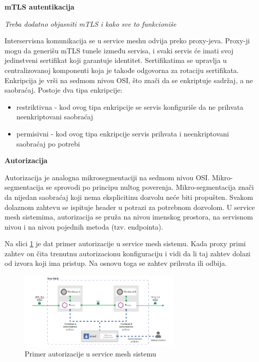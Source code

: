 \documentclass[a4paper,12pt]{report}
\begin{document}
\textbf{mTLS autentikacija}\newline

\textit{Treba dodatno objasniti mTLS i kako sve to funkcioniše}\newline

Interservisna komunikacija se u service meshu odvija preko proxy-jeva. Proxy-ji mogu da generišu mTLS tunele između servisa, i svaki servis će imati svoj jedinstveni sertifikat koji garantuje identitet. Sertifikatima se upravlja u centralizovanoj komponenti koja je takođe odgovorna za rotaciju sertifikata. Enkripcija je vrši na sedmom nivou OSI, što znači da se enkriptuje sadržaj, a ne saobraćaj. 
Postoje dva tipa enkripcije: 

\begin{itemize}
	\item restriktivna - kod ovog tipa enkripcije se servis konfiguriše da ne prihvata neenkriptovani saobraćaj
	\item  permisivni - kod ovog tipa enkripcije servis prihvata i neenkriptovani saobraćaj po potrebi
\end{itemize}

\textbf{Autorizacija}\newline

Autorizacija je analogna mikrosegmentaciji na sedmom nivou OSI. Mikro-segmentacija se sprovodi po principu nultog poverenja. Mikro-segmentacija znači da nijedan saobraćaj koji nema eksplicitinu dozvolu neće biti propušten. Svakom dolaznom zahtevu se ispituje header u potrazi za potrebnom dozvolom. U service mesh sistemima, autorizacija se pruža na nivou imenskog prostora, na servisnom nivou i na nivou pojednih metoda (tzv. endpointa). 

Na slici \ref{fig:authorization-architecture} je dat primer autorizacije u service mesh sistemu. Kada proxy primi zahtev on čita trenutnu autorizacionu konfiguraciju i vidi da li taj zahtev dolazi od izvora koji ima pristup. Na osnovu toga se zahtev prihvata ili odbija. 

\begin{figure}[h]
    \centering
    \includegraphics[width=0.7\textwidth]{authorization_architecture}
    \caption{Primer autorizacije u service mesh sistemu}
    \label{fig:authorization-architecture}
\end{figure} 
\end{document}
